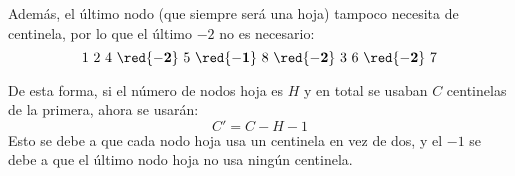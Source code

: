     Además, el último nodo (que siempre será una hoja) tampoco necesita de centinela, por lo que el último $-2$ no es necesario:
    \begin{equation*}
        1~2~4~\red{\mathbf{-2}}~5~\red{\mathbf{-1}}~8~\red{\mathbf{-2}}~3~6~\red{\mathbf{-2}}~7
    \end{equation*}

    De esta forma, si el número de nodos hoja es $H$ y en total se usaban $C$ centinelas de la primera, ahora se usarán:
    \begin{equation*}
        C'=C-H-1
    \end{equation*}
    Esto se debe a que cada nodo hoja usa un centinela en vez de dos, y el $-1$ se debe a que el último nodo hoja no usa ningún centinela.